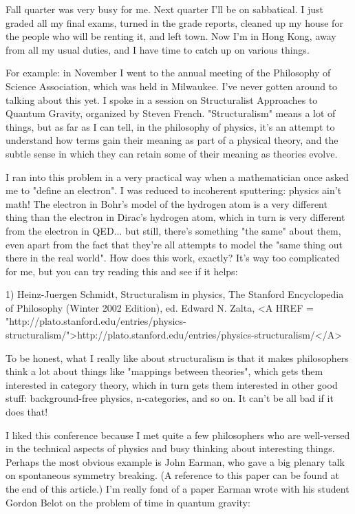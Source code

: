 


Fall quarter was very busy for me.  Next quarter I'll be on
sabbatical.  I just graded all my final exams, turned in the 
grade reports, cleaned up my house for the people who will 
be renting it, and left town.  Now I'm in Hong Kong, away 
from all my usual duties, and I have time to catch up on 
various things.  

For example: in November I went to the annual meeting of the
Philosophy of Science Association, which was held in Milwaukee.
I've never gotten around to talking about this yet.  I spoke
in a session on Structuralist Approaches to Quantum Gravity,
organized by Steven French.  "Structuralism" means a lot of things,
but as far as I can tell, in the philosophy of physics, it's 
an attempt to understand how terms gain their meaning as part 
of a physical theory, and the subtle sense in which they can retain 
some of their meaning as theories evolve.  

I ran into this problem in a very practical way when a mathematician 
once asked me to "define an electron".   I was reduced to incoherent 
sputtering: physics ain't math!  The electron in Bohr's model of the 
hydrogen atom is a very different thing than the electron in Dirac's 
hydrogen atom, which in turn is very different from the electron in 
QED...  but still, there's something "the same" about them, even 
apart from the fact that they're all attempts to model the "same
thing out there in the real world".  How does this work, exactly?  
It's way too complicated for me, but you can try reading this and 
see if it helps:

1) Heinz-Juergen Schmidt, Structuralism in physics, The Stanford 
Encyclopedia of Philosophy (Winter 2002 Edition), ed. Edward N. Zalta, 
<A HREF = "http://plato.stanford.edu/entries/physics-structuralism/">http://plato.stanford.edu/entries/physics-structuralism/</A>  

To be honest, what I really like about structuralism is that it 
makes philosophers think a lot about things like "mappings between 
theories", which gets them interested in category theory, which 
in turn gets them interested in other good stuff: background-free 
physics, n-categories, and so on.   It can't be all bad if it does
that!

I liked this conference because I met quite a few philosophers
who are well-versed in the technical aspects of physics and busy
thinking about interesting things.  Perhaps the most obvious
example is John Earman, who gave a big plenary talk on spontaneous 
symmetry breaking.  (A reference to this paper can be found at the end of this 
article.)  I'm really fond of a paper Earman wrote with his 
student Gordon Belot on the problem of time in quantum gravity:

